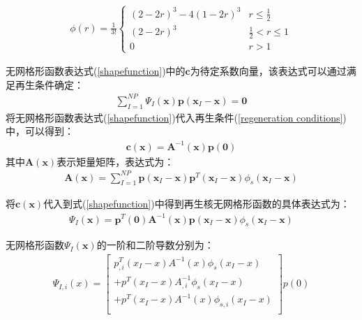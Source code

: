 \begin{equation}
\begin{split}
    \phi(r)=\frac{1}{3!}
\begin{cases}
    (2-2r)^3-4(1-2r)^3 &r\le \frac{1}{2}\\
    (2-2r)^3&\frac{1}{2}<r\le 1\\
    0&r>1
\end{cases}
\end{split}
\end{equation}\par
无网格形函数表达式(\ref{shapefunction})中的$\pmb{c}$为待定系数向量，该表达式可以通过满足再生条件确定：
\begin{equation}\label{regeneration conditions}
\begin{split}
    \sum_{I=1}^{N\!P}\Psi_I(\pmb{x})\pmb{p}(\pmb{x}_I-\pmb{x})=\pmb{0}
\end{split}
\end{equation}
将无网格形函数表达式(\ref{shapefunction})代入再生条件(\ref{regeneration conditions})中，可以得到：
\begin{equation}
\begin{split}
    \pmb{c}(\pmb{x})=\pmb{A}^{-1}(\pmb{x})\pmb{p}(\pmb{0})
\end{split}
\end{equation}
其中$\pmb{A}(\pmb{x})$表示矩量矩阵，表达式为：
\begin{equation}
\begin{split}
    \pmb{A}(\pmb{x})=\sum_{I=1}^{N\!P}\pmb{p}(\pmb{x}_I-\pmb{x})\pmb{p}^T(\pmb{x}_I-\pmb{x})\phi_s(\pmb{x}_I-\pmb{x})
\end{split}
\end{equation}\par
将$\pmb{c}(\pmb{x})$代入到式(\ref{shapefunction})中得到再生核无网格形函数的具体表达式为：
\begin{equation}
\begin{split}
    \Psi_I(\pmb{x})=\pmb{p}^T(\pmb{0})\pmb{A}^{-1}(\pmb{x})\pmb{p}(\pmb{x}_I-\pmb{x})\phi_s(\pmb{x}_I-\pmb{x})
\end{split}
\end{equation}\par
无网格形函数$\Psi_I(\pmb{x})$的一阶和二阶导数分别为：
\begin{equation}
\begin{split}
    \Psi_{I,i}(x)=\left[\begin{matrix}
    p_{,i}^{T}(x_I-x)A^{-1}(x)\phi_s(x_I-x)\\
    +p^{T}(x_I-x)A_{,i}^{-1}\phi_s(x_I-x)\\
    +p^{T}(x_I-x)A^{-1}(x)\phi _{s,i}(x_I-x)\\
    \end{matrix}\right]
    p(0)
\end{split}
\end{equation}
